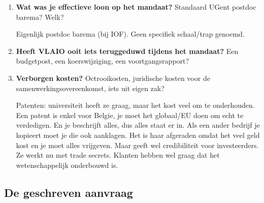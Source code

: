 \documentclass[11pt,a4paper]{article}
\newcommand{\notebox}{%
\begin{tcolorbox}[colback=notebg, colframe=noteborder, boxrule=0.5pt, arc=2pt, left=4pt, right=4pt, top=2pt, bottom=2pt]
\vspace{2.2cm}
\end{tcolorbox}
}
\newcommand{\filledbox}[1]{%
\begin{tcolorbox}[colback=notebg, colframe=noteborder, boxrule=0.5pt, arc=2pt, left=4pt, right=4pt, top=2pt, bottom=2pt]
#1
\end{tcolorbox}
}
\begin{document}
\begin{enumerate}[resume]

\item \textbf{Wat was je effectieve loon op het mandaat?} Standaard UGent postdoc barema? Welk?

\filledbox{Eigenlijk postdoc barema (bij IOF). Geen specifiek schaal/trap genoemd.}

\item \textbf{Heeft VLAIO ooit iets teruggeduwd tijdens het mandaat?} Een budgetpost, een koerswijziging, een voortgangsrapport?

\notebox

\item \textbf{Verborgen kosten?} Octrooikosten, juridische kosten voor de samenwerkingsovereenkomst, iets uit eigen zak?

\filledbox{Patenten: universiteit heeft ze graag, maar het kost veel om te onderhouden. Een patent is enkel voor Belgie, je moet het globaal/EU doen om echt te verdedigen. En je beschrijft alles, dus alles staat er in. Als een ander bedrijf je kopieert moet je die ook aanklagen. Het is haar afgeraden omdat het veel geld kost en je moet alles vrijgeven. Maar geeft wel credibiliteit voor investeerders. Ze werkt nu met trade secrets. Klanten hebben wel graag dat het wetenschappelijk onderbouwd is.}

\end{enumerate}

\subsection{De geschreven aanvraag}
\end{document}
